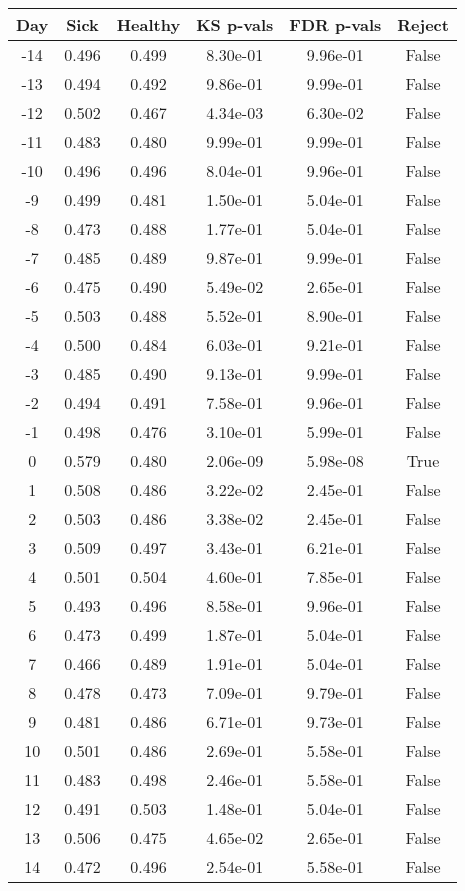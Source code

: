 \begin{tabular}{c|c|c|c|c|c}
Day &  Sick & Healthy &  KS p-vals & FDR p-vals & Reject\\
\hline
-14 & 0.496 &   0.499 &   8.30e-01 &   9.96e-01 &  False\\
-13 & 0.494 &   0.492 &   9.86e-01 &   9.99e-01 &  False\\
-12 & 0.502 &   0.467 &   4.34e-03 &   6.30e-02 &  False\\
-11 & 0.483 &   0.480 &   9.99e-01 &   9.99e-01 &  False\\
-10 & 0.496 &   0.496 &   8.04e-01 &   9.96e-01 &  False\\
 -9 & 0.499 &   0.481 &   1.50e-01 &   5.04e-01 &  False\\
 -8 & 0.473 &   0.488 &   1.77e-01 &   5.04e-01 &  False\\
 -7 & 0.485 &   0.489 &   9.87e-01 &   9.99e-01 &  False\\
 -6 & 0.475 &   0.490 &   5.49e-02 &   2.65e-01 &  False\\
 -5 & 0.503 &   0.488 &   5.52e-01 &   8.90e-01 &  False\\
 -4 & 0.500 &   0.484 &   6.03e-01 &   9.21e-01 &  False\\
 -3 & 0.485 &   0.490 &   9.13e-01 &   9.99e-01 &  False\\
 -2 & 0.494 &   0.491 &   7.58e-01 &   9.96e-01 &  False\\
 -1 & 0.498 &   0.476 &   3.10e-01 &   5.99e-01 &  False\\
  0 & 0.579 &   0.480 &   2.06e-09 &   5.98e-08 &   True\\
  1 & 0.508 &   0.486 &   3.22e-02 &   2.45e-01 &  False\\
  2 & 0.503 &   0.486 &   3.38e-02 &   2.45e-01 &  False\\
  3 & 0.509 &   0.497 &   3.43e-01 &   6.21e-01 &  False\\
  4 & 0.501 &   0.504 &   4.60e-01 &   7.85e-01 &  False\\
  5 & 0.493 &   0.496 &   8.58e-01 &   9.96e-01 &  False\\
  6 & 0.473 &   0.499 &   1.87e-01 &   5.04e-01 &  False\\
  7 & 0.466 &   0.489 &   1.91e-01 &   5.04e-01 &  False\\
  8 & 0.478 &   0.473 &   7.09e-01 &   9.79e-01 &  False\\
  9 & 0.481 &   0.486 &   6.71e-01 &   9.73e-01 &  False\\
 10 & 0.501 &   0.486 &   2.69e-01 &   5.58e-01 &  False\\
 11 & 0.483 &   0.498 &   2.46e-01 &   5.58e-01 &  False\\
 12 & 0.491 &   0.503 &   1.48e-01 &   5.04e-01 &  False\\
 13 & 0.506 &   0.475 &   4.65e-02 &   2.65e-01 &  False\\
 14 & 0.472 &   0.496 &   2.54e-01 &   5.58e-01 &  False\\
\end{tabular}
